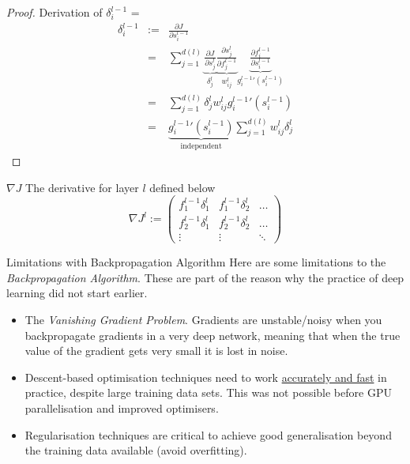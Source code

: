 \documentclass[11pt,a4paper]{article}
\begin{document}
  \begin{proof}{Derivation of $\delta_i^{l-1}$}
    \everymath={\displaystyle}
    \[\begin{array}{rrl}
      \delta_i^{l-1}&:=&\frac{\partial J}{\partial s_i^{l-1}}\\
      &=&\sum_{j=1}^{d(l)}\underbrace{\frac{\partial J}{\partial s_j^l}}_{\delta_j^l} \underbrace{\frac{\partial s_j^l}{\partial f_j^{l-1}}}_{w_{ij}^l} \underbrace{\frac{\partial f_i^{l-1}}{\partial s_i^{l-1}}}_{g^{l-1}_i'(s_i^{l-1})}\\
      &=&\sum_{j=1}^{d(l)}\delta_j^lw_{ij}^lg_i^{l-1}'(s_i^{l-1})\\
      &=&\underbrace{g_i^{l-1}'(s_i^{l-1})}_\text{independent}\sum_{j=1}^{d(l)}w_{ij}^l\delta_j^l
      \end{array}\]
  \end{proof}

  \begin{definition}{$\nabla J$}
    The derivative for layer $l$ defined below
    \[ \nabla J^l:=\begin{pmatrix}
      f_1^{l-1}\delta_1^l & f_1^{l-1}\delta_2^l & \dots \\
      f_2^{l-1}\delta_1^l & f_2^{l-1}\delta_2^l & \dots \\
      \vdots & \vdots & \ddots
    \end{pmatrix} \] %
  \end{definition}

  \begin{remark}{Limitations with Backpropagation Algorithm}
    Here are some limitations to the \textit{Backpropagation Algorithm}. These are part of the reason why the practice of deep learning did not start earlier.
    \begin{itemize}
      \item The \textit{Vanishing Gradient Problem}. Gradients are unstable/noisy when you backpropagate gradients in a very deep network, meaning that when the true value of the gradient gets very small it is lost in noise.
      \item Descent-based optimisation techniques need to work \underline{accurately and fast} in practice, despite large training data sets. This was not possible before GPU parallelisation and improved optimisers.
      \item Regularisation techniques are critical to achieve good generalisation beyond the training data available (avoid overfitting).
    \end{itemize}
  \end{remark}
\end{document}
